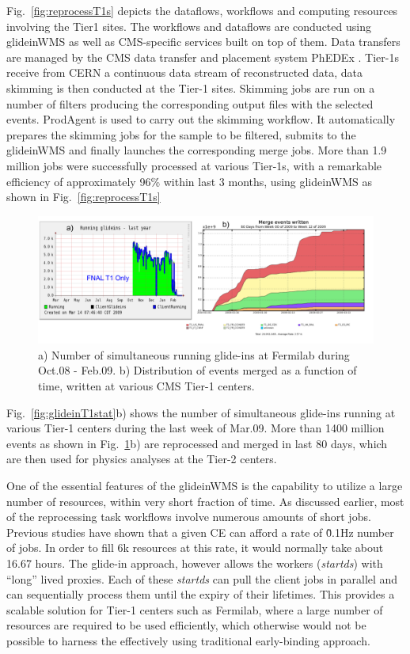 \documentclass[a4paper]{jpconf}
\begin{document}
Fig.~\ref{fig:reprocessT1s} depicts the dataflows, workflows and computing resources involving the Tier1 sites.
The workflows and dataflows are conducted using glideinWMS  as well as CMS-specific services 
built on top of them. Data transfers are managed by the CMS data transfer and placement 
system PhEDEx \cite{bib:cms_phedex}. Tier-1s receive from CERN a continuous data stream of reconstructed data, data skimming 
is then conducted at the Tier-1 sites. Skimming jobs are run on a number of filters producing the 
corresponding output files with the selected events. ProdAgent is used to carry out the skimming workflow. 
It automatically prepares the skimming jobs for the sample to be filtered, submits to the glideinWMS and finally
launches the corresponding merge jobs. More than 1.9 million jobs were successfully processed at various 
Tier-1s, with a remarkable efficiency of approximately 96\% within last 3 months, using glideinWMS as shown 
in Fig.~\ref{fig:reprocessT1s}
\begin{figure}
\begin{center}
\includegraphics[scale=0.55]{merged_events}
\end{center}
\caption{a) Number of simultaneous running glide-ins at Fermilab during Oct.08 - Feb.09. b) Distribution of 
events merged as a function of time, written at various CMS Tier-1 centers.}
\label{fig:merged_events}
\end{figure}
Fig.~\ref{fig:glideinT1stat}b) shows the number of simultaneous glide-ins running at various Tier-1 centers during the last week of Mar.09. 
More than 1400 million events as shown in Fig.~\ref{fig:merged_events}b) are reprocessed and merged in last 80 days, which are then 
used for physics analyses at the Tier-2 centers. 

One of the essential features of the glideinWMS is the capability to utilize a large number of
resources, within very short fraction of time. As discussed earlier, most of the reprocessing task 
workflows involve numerous amounts of short jobs. Previous studies have shown that a given CE can 
afford a rate of \~0.1Hz number of jobs. In order to fill 6k resources at this rate, it would normally take 
about 16.67 hours.  The glide-in approach, however allows the workers (\emph{startds}) with ``long'' lived proxies. 
Each of these \emph{startds} can pull the client jobs in parallel and can sequentially process them until 
the expiry of their lifetimes. This provides a scalable solution for Tier-1 centers such as Fermilab, 
where a large number of resources are required to be used efficiently, which otherwise would not 
be possible to harness the effectively using traditional early-binding approach.
\end{document}
